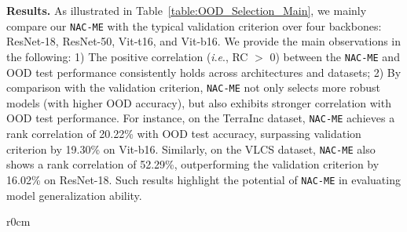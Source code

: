 \documentclass{article} \usepackage{iclr2024_conference,times}
\newcommand{\ie}{\textit{i}.\textit{e}.}
\newcommand{\bfstart}[1]{\noindent\textbf{#1.}}
\begin{document}
\bfstart{Results} As illustrated in Table~\ref{table:OOD_Selection_Main}, we mainly compare our \texttt{NAC-ME} with the typical validation criterion over four backbones: ResNet-18, ResNet-50, Vit-t16, and Vit-b16. 
We provide the main observations in the following:
1) The positive correlation (\ie, RC $>$ 0) between the \texttt{NAC-ME} and OOD test performance consistently holds across architectures and datasets; 
2) By comparison with the validation criterion, \texttt{NAC-ME} not only selects more robust models (with higher OOD accuracy), but also exhibits stronger correlation with OOD test performance. For instance, on the TerraInc dataset, \texttt{NAC-ME} achieves a rank correlation of 20.22\% with OOD test accuracy, surpassing validation criterion by 19.30\% on Vit-b16. 
Similarly, on the VLCS dataset, \texttt{NAC-ME} also shows a rank correlation of 52.29\%, outperforming the validation criterion by 16.02\% on ResNet-18. 
Such results highlight the potential of \texttt{NAC-ME} in evaluating model generalization ability.















\setlength\intextsep{0pt}
\begin{wraptable}[10]{r}{0cm}
	\caption{OOD generalization results on \texttt{PACS}~\citep{Dataset:PACS}, averaged over 3 trials. Backbone: ResNet-18.}
	\label{Tab:OOD_Selection_SoTA}
\end{wraptable}
\end{document}
